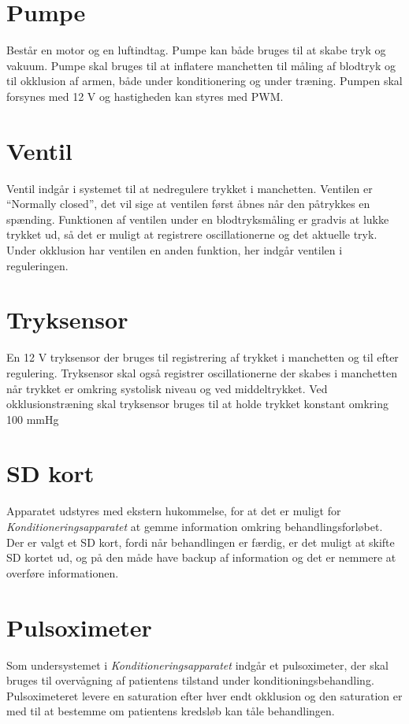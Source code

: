 \section{Pumpe}
Består en motor og en luftindtag. Pumpe kan både bruges til at skabe tryk og vakuum. Pumpe skal bruges til at inflatere manchetten til måling af blodtryk og til okklusion af armen, både under konditionering og under træning. Pumpen skal forsynes med 12 V og hastigheden kan styres med PWM. 

\section{Ventil}
Ventil indgår i systemet til at nedregulere trykket i manchetten. Ventilen er “Normally closed”, det vil sige at ventilen først åbnes når den påtrykkes en spænding. Funktionen af ventilen under en blodtryksmåling er gradvis at lukke trykket ud, så det er muligt at registrere oscillationerne og det aktuelle tryk. Under okklusion har ventilen en anden funktion, her indgår ventilen i reguleringen.

\section{Tryksensor}
En 12 V tryksensor der bruges til registrering af trykket i manchetten og til efter regulering. Tryksensor skal også registrer oscillationerne der skabes i manchetten når trykket er omkring systolisk niveau og ved middeltrykket. Ved okklusionstræning skal tryksensor bruges til at holde trykket konstant omkring 100 mmHg

\section{SD kort}
Apparatet udstyres med ekstern hukommelse, for at det er muligt for \textit{Konditioneringsapparatet} at gemme information omkring behandlingsforløbet. Der er valgt et SD kort, fordi når behandlingen er færdig, er det muligt at skifte SD kortet ud, og på den måde have backup af information og det er nemmere at overføre informationen. 

\section{Pulsoximeter}
Som undersystemet i \textit{Konditioneringsapparatet} indgår et pulsoximeter, der skal bruges til overvågning af patientens tilstand under konditioningsbehandling. Pulsoximeteret levere en saturation efter hver endt okklusion og den saturation er med til at bestemme om patientens kredsløb kan tåle behandlingen.